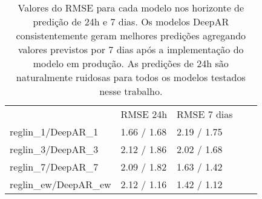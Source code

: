 \begin{center}
\begin{table}[]
  \centering
  \begin{tabular}{l|llll}
    \cline{2-3}
    & \multicolumn{1}{l|}{RMSE 24h} & \multicolumn{1}{l|}{RMSE 7 dias} &  \\ \cline{1-3}
    \multicolumn{1}{|l|}{reglin\_1/DeepAR\_1} & 1.66 / 1.68                   & 2.19 / 1.75                      &  \\ \cline{1-1}
    \multicolumn{1}{|l|}{reglin\_3/DeepAR\_3} & 2.12 / 1.86                   & 2.02 / 1.68                      &  \\ \cline{1-1}
    \multicolumn{1}{|l|}{reglin\_7/DeepAR\_7} & 2.09 / 1.82                   & 1.63 / 1.42                      &  \\ \cline{1-1}
    \multicolumn{1}{|l|}{reglin\_ew/DeepAR\_ew} & 2.12 / 1.16                   & 1.42 / 1.12                      &  \\ \cline{1-1}
  \end{tabular}
  \caption{Valores do RMSE para cada modelo nos horizonte de predição de 24h e 7
    dias. Os modelos DeepAR consistentemente geram melhores predições agregando valores previstos por 7 dias
    após a implementação do modelo em produção. As predições de 24h são naturalmente
    ruidosas para todos os modelos testados nesse trabalho.}
\label{tb:rmsedeepar}
\end{table}
\end{center}

